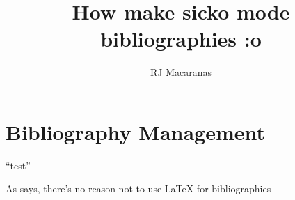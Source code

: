 \documentclass{article}
\author{RJ Macaranas}
\title{How make sicko mode bibliographies :o}
\begin{document}
\maketitle

\section{Bibliography Management}

``test''

As \textcite{test} says, there's no reason not to use \LaTeX{} for
bibliographies
\printbibliography
\end{document}
